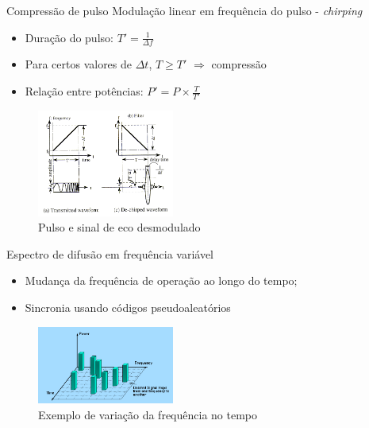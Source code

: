 \documentclass[portuguese,10pt]{beamer}
\begin{document}
\begin{frame}{Compressão de pulso}
 Modulação linear em frequência do pulso - \textit{chirping}
    \begin{itemize}
    \item Duração do pulso: $T' = \frac{1}{\Delta f}$
    \item Para certos valores de $\Delta t$, $T \ge T'$ $\Rightarrow$ compressão
    \item Relação entre potências: $P' = P \times \frac{T}{T'}$
    \end{itemize}

\begin{figure}[ht]
\centering
\includegraphics[width=0.4\textwidth]{graphics/chirped_result.PNG}
\caption{Pulso e sinal de eco desmodulado}
\label{chirped_result}
\end{figure}
\end{frame}


\begin{frame}{Espectro de difusão em frequência variável}
    \begin{itemize}
    \item Mudança da frequência de operação ao longo do tempo;
    \item Sincronia usando códigos pseudoaleatórios
    \end{itemize}
    \begin{figure}[ht]
\centering
\includegraphics[width=0.4\textwidth]{graphics/frequency_hopping.png}
\caption{Exemplo de variação da frequência no tempo}
\label{frequency_hopping}
\end{figure}
\end{frame}
    
\end{document}
